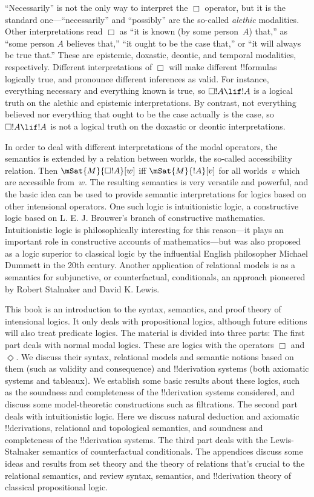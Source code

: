 ``Necessarily'' is not the only way to interpret the $\Box$ operator,
but it is the standard one---``necessarily'' and ``possibly'' are the
so-called \emph{alethic} modalities. Other interpretations read $\Box$
as ``it is known (by some person~$A$) that,'' as ``some person $A$
believes that,'' ``it ought to be the case that,'' or ``it will always
be true that.'' These are epistemic, doxastic, deontic, and temporal
modalities, respectively. Different interpretations of $\Box$ will
make different !!{formula}s logically true, and pronounce different
inferences as valid. For instance, everything necessary and everything
known is true, so $\Box !A \lif !A$ is a logical truth on the alethic
and epistemic interpretations. By contrast, not everything believed
nor everything that ought to be the case actually is the case, so
$\Box !A \lif !A$ is not a logical truth on the doxastic or deontic
interpretations. 

In order to deal with different interpretations of the modal
operators, the semantics is extended by a relation between worlds, the
so-called accessibility relation.  Then $\mSat{M}{\Box !A}[w]$ iff
$\mSat{M}{!A}[v]$ for all worlds~$v$ which are accessible from~$w$.
The resulting semantics is very versatile and powerful, and the basic
idea can be used to provide semantic interpretations for logics based
on other intensional operators. One such logic is intuitionistic
logic, a constructive logic based on L. E. J. Brouwer's branch of
constructive mathematics. Intuitionistic logic is philosophically
interesting for this reason---it plays an important role in
constructive accounts of mathematics---but was also proposed as a logic
superior to classical logic by the influential English philosopher
Michael Dummett in the 20th century. Another application of relational
models is as a semantics for subjunctive, or counterfactual,
conditionals, an approach pioneered by Robert Stalnaker and David K.
Lewis.

This book is an introduction to the syntax, semantics, and proof
theory of intensional logics. It only deals with propositional logics,
although future editions will also treat predicate logics.  The
material is divided into three parts: The first part deals with normal
modal logics. These are logics with the operators $\Box$
and~$\Diamond$. We discuss their syntax, relational models and
semantic notions based on them (such as validity and consequence) and
!!{derivation} systems (both axiomatic systems and tableaux). We establish some
basic results about these logics, such as the soundness and
completeness of the !!{derivation} systems considered, and discuss some
model-theoretic constructions such as filtrations. The second part
deals with intuitionistic logic. Here we discuss natural deduction and
axiomatic !!{derivation}s, relational and topological semantics, and
soundness and completeness of the !!{derivation} systems. The third part deals
with the Lewis-Stalnaker semantics of counterfactual conditionals. The
appendices discuss some ideas and results from set theory and the
theory of relations that's crucial to the relational semantics, and
review syntax, semantics, and !!{derivation} theory of classical propositional
logic.
